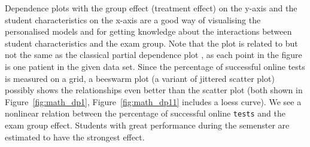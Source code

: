 \documentclass{josr}\usepackage[]{graphicx}\usepackage[]{color}
\newcommand{\hlstd}[1]{\textcolor[rgb]{0.345,0.345,0.345}{#1}}%
\newcommand{\new}[1]{{\color{blue} #1}}
\begin{document}
Dependence plots with the group effect (treatment effect) on the y-axis and
the student characteristics on the x-axis are a good way of visualising the
personalised models and for getting knowledge about the interactions between
student characteristics and the exam group.
\new{
Note that the plot is related to but not the same as the classical partial
dependence plot \citep{friedman2001greedy}, as each point in the figure is one
patient in the given data set.  Since the percentage of successful online tests
is measured on a grid, a beeswarm plot (a variant of jittered scatter plot)
possibly shows the relationships even better than the scatter plot (both shown
in Figure~\ref{fig:math_dp1}, Figure~\ref{fig:math_dp11} includes a loess
curve). We see a nonlinear relation between the percentage of successful online
\texttt{\hlstd{tests}} and the exam group effect. Students with great
performance during the semenster are estimated to have the strongest effect.
}
\end{document}
